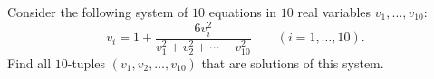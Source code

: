 Consider the following system of $10$ equations in $10$ real variables $v_1, \ldots, v_{10}$:\[v_i = 1 + \frac{6v_i^2}{v_1^2 + v_2^2 + \cdots + v_{10}^2} \qquad (i = 1, \ldots, 10).\]Find all $10$-tuples $(v_1, v_2, \ldots , v_{10})$ that are solutions of this system.